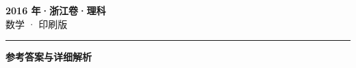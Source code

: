 \documentclass[zihao=5, a4paper]{ctexart}
\begin{document}
\begin{center}
  {\Large\bfseries 2016 年·浙江卷·理科}\\[4pt]
  {\large 数学 · 印刷版}
\end{center}
\medskip
{}

\par\bigskip\hrule\bigskip
{}
\begin{center}{\large\bfseries 参考答案与详细解析}\end{center}
\smallskip

\end{document}
